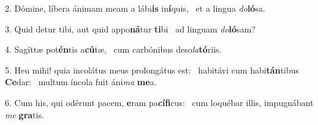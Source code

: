 2. Dómine, líbera ánimam meam a lábi\textbf{is} in\textbf{í}quis, \ast\  et a lingua \textit{do}\textbf{ló}sa.\

3. Quid detur tibi, aut quid appo\textbf{ná}tur \textbf{ti}bi \ast\  ad linguam \textit{do}\textbf{ló}sam?\

4. Sagíttæ pot\textbf{én}tis a\textbf{cú}tæ, \ast\  cum carbónibus deso\textit{la}\textbf{tó}riis.\

5. Heu mihi! quia incolátus meus prolongátus est: \dag\  habitávi cum habi\textbf{tán}tibus \textbf{Ce}dar: \ast\  multum íncola fuit áni\textit{ma} \textbf{me}a.\

6. Cum his, qui odérunt pacem, \textbf{e}ram pa\textbf{cí}\textbf{fi}cus: \ast\  cum loquébar illis, impugnábant \textit{me} \textbf{gra}tis.\

